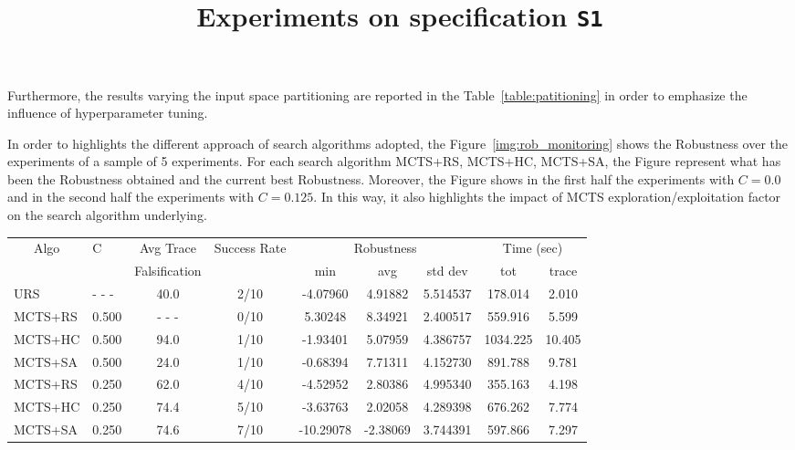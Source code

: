 \documentclass[11pt]{article}
\begin{document}
Furthermore, the results varying the input space partitioning are reported in the Table~\ref{table:patitioning} in order to emphasize the influence of hyperparameter tuning.

In order to highlights the different approach of search algorithms adopted, the Figure~\ref{img:rob_monitoring} shows the Robustness over the experiments of a sample of 5 experiments. For each search algorithm MCTS+RS, MCTS+HC, MCTS+SA, the Figure represent what has been the Robustness obtained and the current best Robustness. Moreover, the Figure shows in the first half the experiments with $C=0.0$ and in the second half the experiments with $C=0.125$. In this way, it also highlights the impact of MCTS exploration/exploitation factor on the search algorithm underlying.

\begin{table}[ht]
\centering
\title{Experiments on specification \texttt{S1}}
\begin{tabular}{|l|l|c|c|c|c|c|c|c|}
\hline
\multicolumn{1}{|c|}{\multirow{2}{*}{Algo}} & \multirow{2}{*}{C} & Avg Trace               & \multirow{2}{*}{Success Rate} & \multicolumn{3}{c|}{Robustness} & \multicolumn{2}{c|}{Time (sec)} \\ \cline{5-9} 
\multicolumn{1}{|c|}{}                      &                    & Falsification           &                               & min       & avg      & std dev  & tot        & trace        \\ \hline
URS                                         & - - -              &  40.0                   & 2/10                          & -4.07960  & 4.91882  & 5.514537 &  178.014 &  2.010    \\ \hline
MCTS+RS                                     & 0.500              & - - -                   & 0/10                          &  5.30248  & 8.34921  & 2.400517 &  559.916 &  5.599    \\
MCTS+HC                                     & 0.500              &  94.0                   & 1/10                          & -1.93401  & 5.07959  & 4.386757 & 1034.225 & 10.405    \\
MCTS+SA                                     & 0.500              &  24.0                   & 1/10                          & -0.68394  & 7.71311  & 4.152730 &  891.788 &  9.781    \\ \hline

MCTS+RS                                     & 0.250              &  62.0                   & 4/10                          & -4.52952  &  2.80386 & 4.995340 &  355.163 &  4.198    \\
MCTS+HC                                     & 0.250              &  74.4                   & 5/10                          & -3.63763  &  2.02058 & 4.289398 &  676.262 &  7.774    \\
MCTS+SA                                     & 0.250              &  74.6                   & 7/10                          & -10.29078 & -2.38069 & 3.744391 &  597.866 &  7.297    \\ \hline


\end{tabular}
\end{table}
\end{document}
